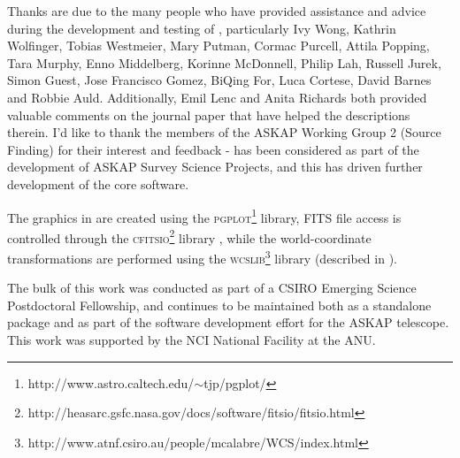 %
%
%
%

Thanks are due to the many people who have provided assistance and
advice during the development and testing of \duchamp, particularly
Ivy Wong, Kathrin Wolfinger, Tobias Westmeier, Mary Putman, Cormac
Purcell, Attila Popping, Tara Murphy, Enno Middelberg, Korinne
McDonnell, Philip Lah, Russell Jurek, Simon Guest, Jose Francisco
Gomez, BiQing For, Luca Cortese, David Barnes and Robbie
Auld. Additionally, Emil Lenc and Anita Richards both provided
valuable comments on the journal paper that have helped the
descriptions therein. I'd like to thank the members of the ASKAP
Working Group 2 (Source Finding) for their interest and feedback -
\duchamp has been considered as part of the development of ASKAP
Survey Science Projects, and this has driven further development of
the core \duchamp software.

The graphics in \duchamp are created using the
\textsc{pgplot}\footnote{http://www.astro.caltech.edu/$\sim$tjp/pgplot/}
library, FITS file access is controlled through the
\textsc{cfitsio}\footnote{http://heasarc.gsfc.nasa.gov/docs/software/fitsio/fitsio.html}
library \citep{pence99}, while the world-coordinate transformations
are performed using the
\textsc{wcslib}\footnote{http://www.atnf.csiro.au/people/mcalabre/WCS/index.html}
library (described in \citet{calabretta02}).

The bulk of this work was conducted as part of a CSIRO Emerging
Science Postdoctoral Fellowship, and \duchamp continues to be
maintained both as a standalone package and as part of the software
development effort for the ASKAP telescope. This work was supported by
the NCI National Facility at the ANU.



